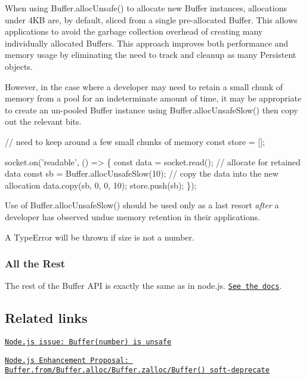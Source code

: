 When using {\ttfamily Buffer.\+alloc\+Unsafe()} to allocate new {\ttfamily Buffer} instances, allocations under 4\+KB are, by default, sliced from a single pre-\/allocated {\ttfamily Buffer}. This allows applications to avoid the garbage collection overhead of creating many individually allocated Buffers. This approach improves both performance and memory usage by eliminating the need to track and cleanup as many {\ttfamily Persistent} objects.

However, in the case where a developer may need to retain a small chunk of memory from a pool for an indeterminate amount of time, it may be appropriate to create an un-\/pooled Buffer instance using {\ttfamily Buffer.\+alloc\+Unsafe\+Slow()} then copy out the relevant bits.


\begin{DoxyCode}
// need to keep around a few small chunks of memory
const store = [];

socket.on('readable', () => \{
  const data = socket.read();
  // allocate for retained data
  const sb = Buffer.allocUnsafeSlow(10);
  // copy the data into the new allocation
  data.copy(sb, 0, 0, 10);
  store.push(sb);
\});
\end{DoxyCode}


Use of {\ttfamily Buffer.\+alloc\+Unsafe\+Slow()} should be used only as a last resort {\itshape after} a developer has observed undue memory retention in their applications.

A {\ttfamily Type\+Error} will be thrown if {\ttfamily size} is not a number.

\subsubsection*{All the Rest}

The rest of the {\ttfamily Buffer} A\+PI is exactly the same as in node.\+js. \href{https://nodejs.org/api/buffer.html}{\tt See the docs}.

\subsection*{Related links}


\begin{DoxyItemize}
\item \href{https://github.com/nodejs/node/issues/4660}{\tt Node.\+js issue\+: Buffer(number) is unsafe}
\item \href{https://github.com/nodejs/node-eps/pull/4}{\tt Node.\+js Enhancement Proposal\+: Buffer.\+from/\+Buffer.alloc/\+Buffer.\+zalloc/\+Buffer() soft-\/deprecate}
\end{DoxyItemize}

